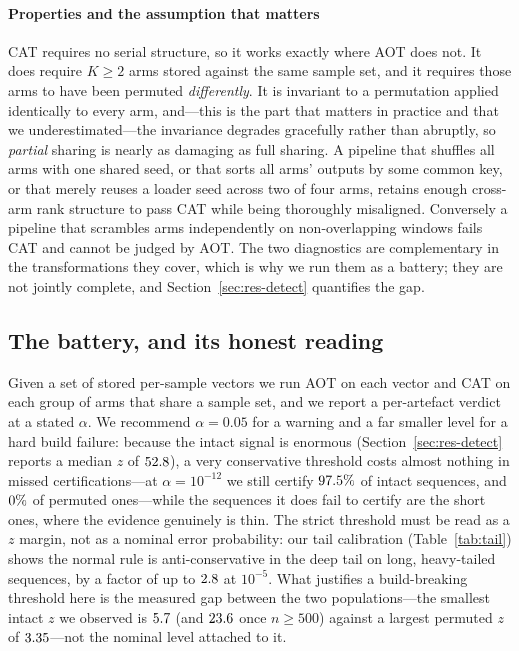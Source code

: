 \documentclass[a4paper,fleqn]{cas-sc}
\begin{document}
\paragraph{Properties and the assumption that matters}
CAT requires no serial structure, so it works exactly where AOT does not. It does
require $K \ge 2$ arms stored against the same sample set, and it requires those
arms to have been permuted \emph{differently}. It is invariant to a permutation
applied identically to every arm, and---this is the part that matters in practice
and that we underestimated---the invariance degrades gracefully rather than
abruptly, so \emph{partial} sharing is nearly as damaging as full sharing. A
pipeline that shuffles all arms with one shared
seed, or that sorts all arms' outputs by some common key, or that merely reuses a
loader seed across two of four arms, retains enough cross-arm rank structure to
pass CAT while being thoroughly misaligned. Conversely a pipeline that scrambles
arms independently on
non-overlapping windows fails CAT and cannot be judged by AOT. The two
diagnostics are complementary in the transformations they cover, which is why we
run them as a battery; they are not jointly complete, and
Section~\ref{sec:res-detect} quantifies the gap.

\subsection{The battery, and its honest reading}
\label{sec:battery}

Given a set of stored per-sample vectors we run AOT on each vector and CAT on each
group of arms that share a sample set, and we report a per-artefact verdict at a
stated $\alpha$. We recommend $\alpha = 0.05$ for a warning and a far smaller
level for a hard build failure: because the intact signal is enormous
(Section~\ref{sec:res-detect} reports a median $z$ of $52.8{}$), a very
conservative threshold costs almost nothing in missed certifications---at
$\alpha = 10^{-12}$ we still certify $97.5\%$ of intact
sequences, and $0\%$ of permuted ones---while the sequences
it does fail to certify are the short ones, where the evidence genuinely is thin.
The strict threshold must be read as a $z$ margin, not as a nominal error
probability: our tail calibration (Table~\ref{tab:tail}) shows the normal rule is
anti-conservative in the deep tail on long, heavy-tailed sequences, by a factor of
up to $2.8{}$ at $10^{-5}$. What justifies a build-breaking threshold
here is the measured gap between the two populations---the smallest intact $z$ we
observed is $5.7{}$ (and $23.6{}$ once $n \ge 500$) against a
largest permuted $z$ of $3.35{}$---not the nominal level attached to it.
\end{document}
